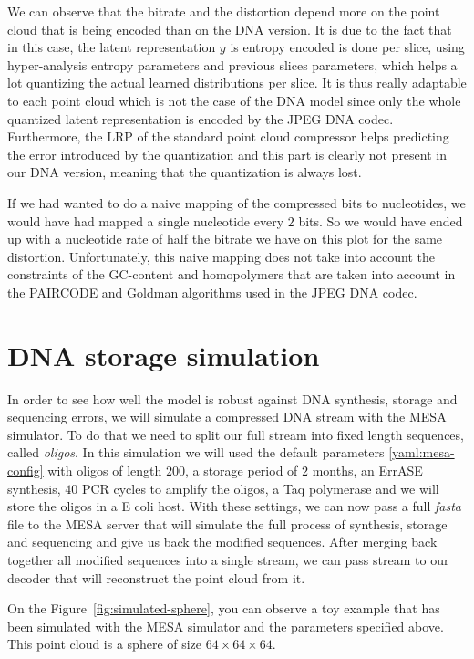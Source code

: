 We can observe that the bitrate and the distortion depend more on the point cloud that is being encoded than on the DNA version. It is due to the fact that in this case, the latent representation $y$ is entropy encoded is done per slice, using hyper-analysis entropy parameters and previous slices parameters, which helps a lot quantizing the actual learned distributions per slice. It is thus really adaptable to each point cloud which is not the case of the DNA model since only the whole quantized latent representation is encoded by the JPEG DNA codec. 
Furthermore, the LRP of the standard point cloud compressor helps predicting the error introduced by the quantization and this part is clearly not present in our DNA version, meaning that the quantization is always lost.

If we had wanted to do a naive mapping of the compressed bits to nucleotides, we would have had mapped a single nucleotide every $2$ bits. So we would have ended up with a nucleotide rate of half the bitrate we have on this plot for the same distortion. 
Unfortunately, this naive mapping does not take into account the constraints of the GC-content and homopolymers that are taken into account in the PAIRCODE and Goldman algorithms used in the JPEG DNA codec.

\section{DNA storage simulation}
\label{sec:simu}

In order to see how well the model is robust against DNA synthesis, storage and sequencing errors, we will simulate a compressed DNA stream with the MESA simulator. To do that we need to split our full stream into fixed length sequences, called \textit{oligos}. In this simulation we will used the default parameters \ref{yaml:mesa-config} with oligos of length $200$, a storage period of $2$ months, an ErrASE synthesis, $40$ PCR cycles to amplify the oligos, a Taq polymerase and we will store the oligos in a E coli host. With these settings, we can now pass a full \textit{fasta} file to the MESA server that will simulate the full process of synthesis, storage and sequencing and give us back the modified sequences. After merging back together all modified sequences into a single stream, we can pass stream to our decoder that will reconstruct the point cloud from it. 

On the Figure~\ref{fig:simulated-sphere}, you can observe a toy example that has been simulated with the MESA simulator and the parameters specified above. This point cloud is a sphere of size $64 \times 64 \times 64$.

